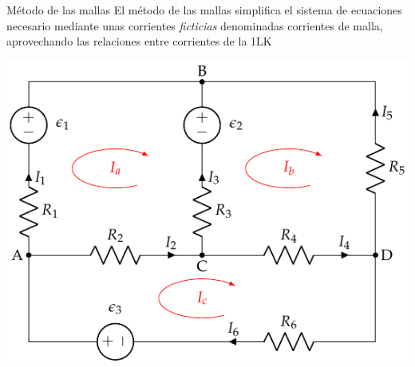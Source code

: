 \documentclass[aspectratio=169, xcolor={usenames,svgnames,dvipsnames}]{beamer}
\begin{document}
\begin{frame}{Método de las mallas}
    El método de las mallas simplifica el sistema de ecuaciones necesario mediante unas corrientes \emph{ficticias} denominadas \alert{corrientes de malla}, aprovechando las relaciones entre corrientes de la 1LK
    
    \begin{center}
    \includegraphics[height=0.7\textheight]{../figs/mallas1_corrientes.pdf}
    \end{center}
\end{frame}

\end{document}
